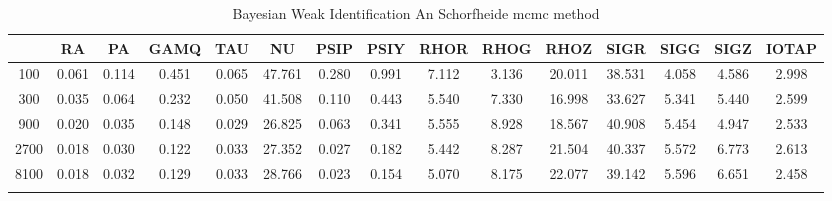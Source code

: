 \documentclass[a4paper,10pt]{article}
\begin{document}
\centering
\begin{longtable}{ccccccccccccccc}
\toprule
 & RA & PA & GAMQ & TAU & NU & PSIP & PSIY & RHOR & RHOG & RHOZ & SIGR & SIGG & SIGZ & IOTAP \\
\midrule
100 & 0.061 & 0.114 & 0.451 & 0.065 & 47.761 & 0.280 & 0.991 & 7.112 & 3.136 & 20.011 & 38.531 & 4.058 & 4.586 & 2.998 \\
300 & 0.035 & 0.064 & 0.232 & 0.050 & 41.508 & 0.110 & 0.443 & 5.540 & 7.330 & 16.998 & 33.627 & 5.341 & 5.440 & 2.599 \\
900 & 0.020 & 0.035 & 0.148 & 0.029 & 26.825 & 0.063 & 0.341 & 5.555 & 8.928 & 18.567 & 40.908 & 5.454 & 4.947 & 2.533 \\
2700 & 0.018 & 0.030 & 0.122 & 0.033 & 27.352 & 0.027 & 0.182 & 5.442 & 8.287 & 21.504 & 40.337 & 5.572 & 6.773 & 2.613 \\
8100 & 0.018 & 0.032 & 0.129 & 0.033 & 28.766 & 0.023 & 0.154 & 5.070 & 8.175 & 22.077 & 39.142 & 5.596 & 6.651 & 2.458 \\
\bottomrule
\caption{Bayesian Weak Identification An Schorfheide mcmc method}
\label{table:tbl:WeakAnScho_mcmc}
\end{longtable}
\end{document}
